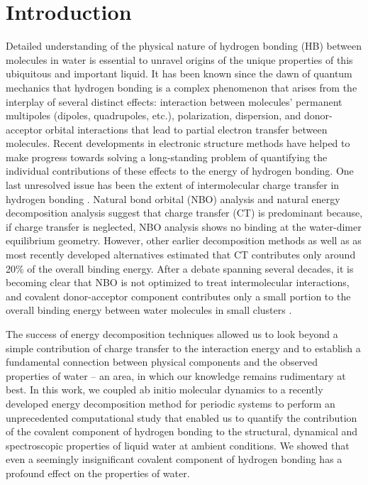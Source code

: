 \documentclass[prl,twocolumn,showpacs]{revtex4}
\begin{document}
\section{Introduction} 

Detailed understanding of the physical nature of hydrogen bonding (HB) between molecules in water is essential to unravel origins of the unique properties of this ubiquitous and important liquid. It has been known since the dawn of quantum mechanics that hydrogen bonding is a complex phenomenon that arises from the interplay of several distinct effects: interaction between molecules’ permanent multipoles (dipoles, quadrupoles, etc.), polarization, dispersion, and donor-acceptor orbital interactions that lead to partial electron transfer between molecules. Recent developments in electronic structure methods have helped to make progress towards solving a long-standing problem of quantifying the individual contributions of these effects to the energy of hydrogen bonding. One last unresolved issue has been the extent of intermolecular charge transfer in hydrogen bonding \cite{isaacs1999covalency,ghanty2000hydrogen,stone2017natural}.
Natural bond orbital (NBO) analysis\cite{weinhold1998natural} and natural energy decomposition analysis \cite{glendening1994natural} suggest that charge transfer (CT) is predominant \cite{schenter1996natural,glendening2005natural,weinhold2005resonance} because, if charge transfer is neglected, NBO analysis shows no binding at the water-dimer equilibrium geometry. However, other earlier decomposition methods \cite{kitaura1976new,bagus1984new,bagus1992decomposition,stevens1987frozen,chen1996energy} as well as as most recently developed alternatives \cite{mo2000energy,misquitta2003dispersion,khaliullin2007unravelling} estimated that CT contributes only around 20\% of the overall binding energy. After a debate spanning several decades, it is becoming clear that NBO is not optimized to treat intermolecular interactions\cite{stone2017natural}, and covalent donor-acceptor component contributes only a small portion to the overall binding energy between water molecules in small clusters \cite{stevens1987frozen,chen1996energy,piquemal2005csov,khaliullin2009electron,cobar2012examination}.



The success of energy decomposition techniques allowed us to look beyond a simple contribution of charge transfer to the interaction energy and to establish a fundamental connection between physical components and the observed properties of water – an area, in which our knowledge remains rudimentary at best. In this work, we coupled ab initio molecular dynamics to a recently developed energy decomposition method for periodic systems \cite{Khaliullin2013JCTC} to perform an unprecedented computational study that enabled us to quantify the contribution of the covalent component of hydrogen bonding to the structural, dynamical and spectroscopic properties of liquid water at ambient conditions. We showed that even a seemingly insignificant covalent component of hydrogen bonding has a profound effect on the properties of water.
\end{document}
